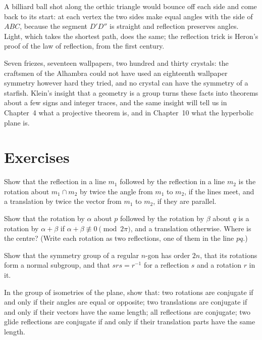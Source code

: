 A billiard ball shot along the orthic triangle would bounce off each side and come back to its start: at each vertex the two sides make
equal angles with the side of $ABC$, because the segment $D'D''$ is straight and reflection preserves angles. Light, which takes the
shortest path, does the same; the reflection trick is Heron's proof of the law of reflection, from the first century.

\begin{beauty}
Seven friezes, seventeen wallpapers, two hundred and thirty crystals: the craftsmen of the Alhambra could not have used an eighteenth
wallpaper symmetry however hard they tried, and no crystal can have the symmetry of a starfish. Klein's insight that a geometry is a
group turns these facts into theorems about a few signs and integer traces, and the same insight will tell us in Chapter~4
what a projective theorem is, and in Chapter~10 what the hyperbolic plane is.
\end{beauty}

\section{Exercises}

\begin{exercise}[$\star$]\label{ex:chasles}
Show that the reflection in a line $m_1$ followed by the reflection in a line $m_2$ is the rotation about $m_1\cap m_2$ by twice the angle
from $m_1$ to $m_2$, if the lines meet, and a translation by twice the vector from $m_1$ to $m_2$, if they are parallel.
\end{exercise}

\begin{exercise}[$\star$]\label{ex:tworotations}
Show that the rotation by $\alpha$ about $p$ followed by the rotation by $\beta$ about $q$ is a rotation by $\alpha+\beta$ if
$\alpha+\beta\not\equiv0\pmod{2\pi}$, and a translation otherwise. Where is the centre? (Write each rotation as two reflections, one of them in
the line $pq$.)
\end{exercise}

\begin{exercise}[$\star$]\label{ex:dihedral}
Show that the symmetry group of a regular $n$-gon has order $2n$, that its rotations form a normal subgroup, and that $srs=r^{-1}$ for a
reflection $s$ and a rotation $r$ in it.
\end{exercise}

\begin{exercise}[$\star\star$]\label{ex:conjugacy}
In the group of isometries of the plane, show that: two rotations are conjugate if and only if their angles are equal or opposite; two
translations are conjugate if and only if their vectors have the same length; all reflections are conjugate; two glide reflections are
conjugate if and only if their translation parts have the same length.
\end{exercise}

